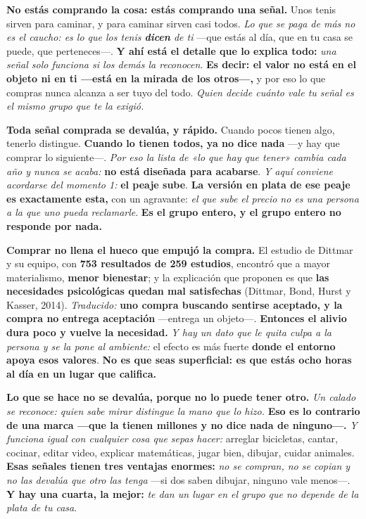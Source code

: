 \documentclass[11pt,letterpaper]{article}
\newcommand{\milcpaso}[3]{%
\Needspace{4\baselineskip}%
\begin{tcolorbox}[enhanced,colback=white,colframe=milcLinea,arc=1.5mm,boxrule=.9pt,
  left=14mm,right=4mm,top=3mm,bottom=3mm,before skip=4pt,after skip=4pt,
  fontupper=\RaggedRight,
  overlay={\node[anchor=north west,circle,fill=#2,text=white,inner sep=0pt,
    minimum size=7.4mm,font=\sffamily\bfseries\small]
    at ([xshift=3.6mm,yshift=-3.2mm]frame.north west) {#1};}]
#3
\end{tcolorbox}}
\begin{document}
\milcpaso{1}{milcTurquesa}{\textbf{No estás comprando la cosa: estás comprando una señal.} Unos tenis sirven para caminar, y para caminar sirven casi todos. \emph{Lo que se paga de más no es el caucho: es lo que los tenis \textbf{dicen} de ti} ---que estás al día, que en tu casa se puede, que perteneces---. \textbf{Y ahí está el detalle que lo explica todo:} \emph{una señal solo funciona si los demás la reconocen}. \textbf{Es decir: el valor no está en el objeto ni en ti ---está en la mirada de los otros---,} y por eso lo que compras nunca alcanza a ser tuyo del todo. \emph{Quien decide cuánto vale tu señal es el mismo grupo que te la exigió.}}
\milcpaso{2}{milcTurquesa}{\textbf{Toda señal comprada se devalúa, y rápido.} Cuando pocos tienen algo, tenerlo distingue. \textbf{Cuando lo tienen todos, ya no dice nada} ---y hay que comprar lo siguiente---. \emph{Por eso la lista de «lo que hay que tener» cambia cada año y nunca se acaba:} \textbf{no está diseñada para acabarse}. \emph{Y aquí conviene acordarse del momento 1:} \textbf{el peaje sube}. \textbf{La versión en plata de ese peaje es exactamente esta,} con un agravante: \emph{el que sube el precio no es una persona a la que uno pueda reclamarle}. \textbf{Es el grupo entero, y el grupo entero no responde por nada.}}
\milcpaso{3}{milcTurquesa}{\textbf{Comprar no llena el hueco que empujó la compra.} El estudio de Dittmar y su equipo, con \textbf{753 resultados de 259 estudios}, encontró que a mayor materialismo, \textbf{menor bienestar}; y la explicación que proponen es que \textbf{las necesidades psicológicas quedan mal satisfechas} (Dittmar, Bond, Hurst y Kasser, 2014). \emph{Traducido:} \textbf{uno compra buscando sentirse aceptado, y la compra no entrega aceptación} ---entrega un objeto---. \textbf{Entonces el alivio dura poco y vuelve la necesidad.} \emph{Y hay un dato que le quita culpa a la persona y se la pone al ambiente:} el efecto es más fuerte \textbf{donde el entorno apoya esos valores}. \textbf{No es que seas superficial: es que estás ocho horas al día en un lugar que califica.}}
\milcpaso{4}{milcTurquesa}{\textbf{Lo que se hace no se devalúa, porque no lo puede tener otro.} \emph{Un calado se reconoce: quien sabe mirar distingue la mano que lo hizo.} \textbf{Eso es lo contrario de una marca ---que la tienen millones y no dice nada de ninguno---.} \emph{Y funciona igual con cualquier cosa que sepas hacer:} arreglar bicicletas, cantar, cocinar, editar video, explicar matemáticas, jugar bien, dibujar, cuidar animales. \textbf{Esas señales tienen tres ventajas enormes:} \emph{no se compran, no se copian y no las devalúa que otro las tenga} ---si dos saben dibujar, ninguno vale menos---. \textbf{Y hay una cuarta, la mejor:} \emph{te dan un lugar en el grupo que no depende de la plata de tu casa}.}
\end{document}

